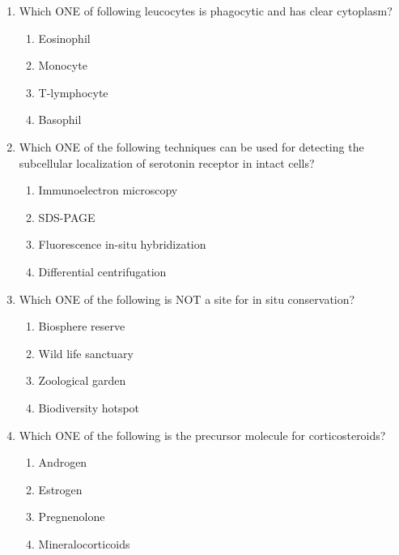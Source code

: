 \documentclass[journal,12pt,onecolumn]{IEEEtran}
\begin{document}
\begin{enumerate}[label=\arabic*.]

\item Which ONE of following leucocytes is phagocytic and has clear cytoplasm?

\begin{multicols}{4}
\begin{enumerate}[label=(\Alph*)]
\item Eosinophil
\item Monocyte
\item T-lymphocyte
\item Basophil
\end{enumerate}
\end{multicols}

\item Which ONE of the following techniques can be used for detecting the subcellular localization of serotonin receptor in intact cells?

\begin{multicols}{2}
\begin{enumerate}[label=(\Alph*)]
\item Immunoelectron microscopy
\item SDS-PAGE
\item Fluorescence in-situ hybridization
\item Differential centrifugation
\end{enumerate}
\end{multicols}

\item Which ONE of the following is NOT a site for in situ conservation?
\begin{multicols}{2}
\begin{enumerate}[label=(\Alph*)]
\item Biosphere reserve
\item Wild life sanctuary
\item Zoological garden
\item Biodiversity hotspot
\end{enumerate}
\end{multicols}

\item Which ONE of the following is the precursor molecule for corticosteroids?

\begin{multicols}{4}
\begin{enumerate}[label=(\Alph*)]
\item Androgen
\item Estrogen
\item Pregnenolone
\item Mineralocorticoids
\end{enumerate}
\end{multicols}


\end{enumerate}
\end{document}
